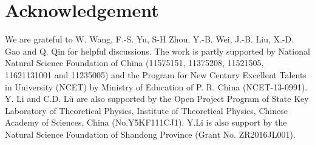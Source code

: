 \documentclass[11pt]{article}
\begin{document}
\section*{Acknowledgement}

We are grateful to  W. Wang, F.-S. Yu,  S-H Zhou, Y.-B. Wei, J.-B. Liu, X.-D.  Gao and Q. Qin for helpful discussions. The work is partly supported by National Natural Science Foundation of China (11575151, 11375208, 11521505, 11621131001 and 11235005) and the Program for New Century Excellent Talents in University (NCET) by Ministry of Education of P. R. China (NCET-13-0991). Y. Li and C.D. L\"u are also supported by the Open Project Program of State Key Laboratory of Theoretical Physics, Institute of Theoretical Physics, Chinese Academy of Sciences, China (No.Y5KF111CJ1).  Y.Li is also support
by the Natural Science Foundation of Shandong Province (Grant No. ZR2016JL001).

\end{document}
